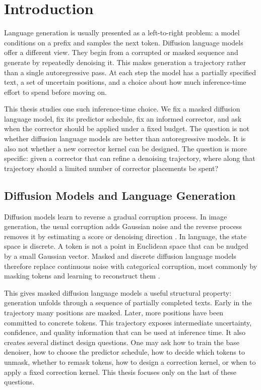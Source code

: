 \chapter{Introduction}
\label{ch:introduction}

Language generation is usually presented as a left-to-right problem: a model
conditions on a prefix and samples the next token. Diffusion language models
offer a different view. They begin from a corrupted or masked sequence and
generate by repeatedly denoising it. This makes generation a trajectory rather
than a single autoregressive pass. At each step the model has a partially
specified text, a set of uncertain positions, and a choice about how much
inference-time effort to spend before moving on.

This thesis studies one such inference-time choice. We fix a masked diffusion
language model, fix its predictor schedule, fix an informed corrector, and ask
when the corrector should be applied under a fixed budget. The question is not
whether diffusion language models are better than autoregressive models. It is
also not whether a new corrector kernel can be designed. The question is more
specific: given a corrector that can refine a denoising trajectory, where along
that trajectory should a limited number of corrector placements be spent?

\section{Diffusion Models and Language Generation}
\label{sec:ch1-diffusion-language}

Diffusion models learn to reverse a gradual corruption process. In image
generation, the usual corruption adds Gaussian noise and the reverse process
removes it by estimating a score or denoising direction
\parencite{ho2020ddpm,song2021score}. In language, the state space is
discrete. A token is not a point in Euclidean space that can be nudged by a
small Gaussian vector. Masked and discrete diffusion language models therefore
replace continuous noise with categorical corruption, most commonly by masking
tokens and learning to reconstruct them
\parencite{sahoo2024mdlm,lou2024sedd,nie2025llada,ye2025dream}.

This gives masked diffusion language models a useful structural property:
generation unfolds through a sequence of partially completed texts. Early in
the trajectory many positions are masked. Later, more positions have been
committed to concrete tokens. This trajectory exposes intermediate
uncertainty, confidence, and quality information that can be used at inference
time. It also creates several distinct design questions. One may ask how to
train the base denoiser, how to choose the predictor schedule, how to decide
which tokens to unmask, whether to remask tokens, how to design a correction
kernel, or when to apply a fixed correction kernel. This thesis focuses only
on the last of these questions.

